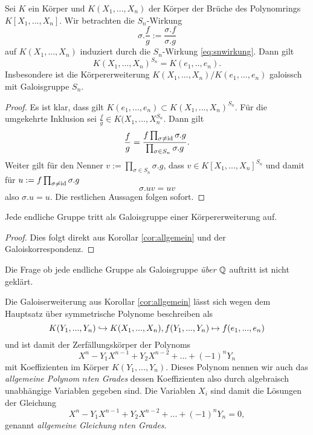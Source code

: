 \documentclass{book}
\begin{document}
\begin{cor}
    \label{cor:allgemein}
    Sei $K$ ein Körper und $K(X_1, ..., X_n)$ der Körper der Brüche des Polynomrings $K[X_1, ..., X_n]$. Wir betrachten die $S_n$-Wirkung
    \[
        \sigma.\frac{f}{g} := \frac{\sigma.f}{\sigma.g} 
    \]
    auf $K(X_1,...,X_n)$ induziert durch die $S_n$-Wirkung \eqref{eq:snwirkung}. Dann gilt
    \[
        K(X_1, ..., X_n)^{S_n} = K(e_1, .., e_n).
    \]
    Insbesondere ist die Körpererweiterung $K(X_1, ..., X_n)/K(e_1, ..., e_n)$
    galoissch mit Galoisgruppe $S_n$. 
\end{cor}
\begin{proof}
    Es ist klar, dass gilt $K(e_1, ..., e_n) \subset K(X_1, ..., X_n)^{S_n}$.
    Für die umgekehrte Inklusion sei $\frac{f}{g} \in K(X_1, ..., X_n^{S_n}$. Dann gilt
    \[
        \frac{f}{g}  = \frac{f \prod_{\sigma \ne \operatorname{id}} \sigma.g}{\prod_{\sigma \in S_n} \sigma.g} .
    \]
    Weiter gilt für den Nenner $v := \prod_{\sigma \in S_n} \sigma.g$, dass $v \in K[X_1, ..., X_n]^{S_n}$ und damit für $u := f \prod_{\sigma \ne \operatorname{id}} \sigma.g$
    \[
        \sigma.u v = u v
    \]
    also $\sigma.u = u$. Die restlichen Aussagen folgen sofort. 
\end{proof}

\begin{cor}
    \label{cor:jede_endliche} Jede endliche Gruppe tritt als Galoisgruppe einer Körpererweiterung auf. 
\end{cor}
\begin{proof}
    Dies folgt direkt aus Korollar \ref{cor:allgemein} und der Galoiskorrespondenz.
\end{proof}

\begin{rem}
    \label{rem:galoisq}
    Die Frage ob jede endliche Gruppe als Galoisgruppe {\em über $\mathbb{Q}$} auftritt ist nicht geklärt. 
\end{rem}


\begin{rem}
    \label{rem:allgemein}
    Die Galoiserweiterung aus Korollar \ref{cor:allgemein} lässt sich wegen dem
    Hauptsatz über symmetrische Polynome beschreiben als
    \[
        K(Y_1, ..., Y_n) \hookrightarrow K(X_1, ..., X_n), f(Y_1, ..., Y_n) \mapsto f(e_1, ..., e_n)
    \]
    und ist damit der Zerfällungskörper der Polynoms
    \[
        X^n - Y_1 X^{n-1} + Y_2 X^{n-2} + ... + (-1)^n Y_n
    \]
    mit Koeffizienten im Körper $K(Y_1, ..., Y_n)$. Dieses Polynom nennen wir
    auch das {\em allgemeine Polynom $n$ten Grades} dessen Koeffizienten also durch 
    algebraisch unabhängige Variablen gegeben sind. Die Variablen $X_i$ sind damit die Lösungen der Gleichung
    \[
        X^n - Y_1 X^{n-1} + Y_2 X^{n-2} + ... + (-1)^n Y_n = 0, 
    \]
    genannt {\em allgemeine Gleichung $n$ten Grades}. 
\end{rem}
\end{document}
